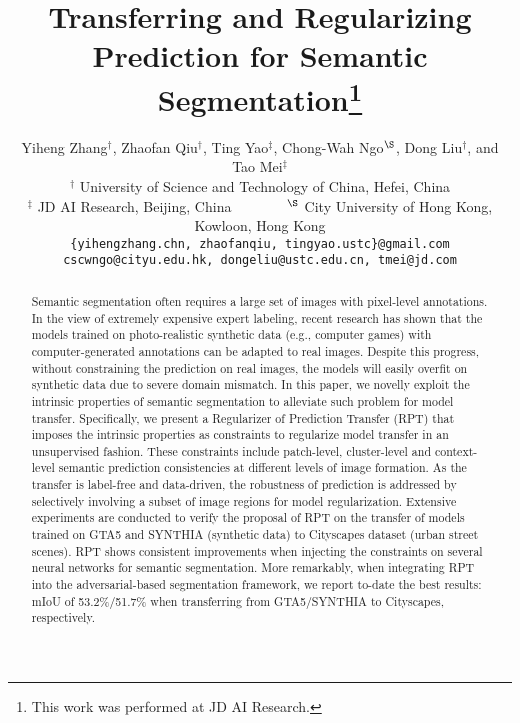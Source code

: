 \documentclass[10pt,twocolumn,letterpaper]{article}
\begin{document}
\title{Transferring and Regularizing Prediction for Semantic Segmentation\thanks{{\small This work was performed at JD AI Research.}}}

\author{Yiheng Zhang$^{\dag}$, Zhaofan Qiu$^{\dag}$, Ting Yao$^{\ddag}$, Chong-Wah Ngo$^{\S}$, Dong Liu$^{\dag}$, and Tao Mei$^{\ddag}$ \\
{\normalsize $^{\dag}$ University of Science and Technology of China, Hefei, China}\\
{\normalsize $^{\ddag}$ JD AI Research, Beijing, China~~~~~~~~$^{\S}$ City University of Hong Kong, Kowloon, Hong Kong}\\
{\tt\small \{yihengzhang.chn, zhaofanqiu, tingyao.ustc\}@gmail.com}\\
{\tt\small cscwngo@cityu.edu.hk, dongeliu@ustc.edu.cn, tmei@jd.com}
}

\maketitle
\thispagestyle{empty}

\begin{abstract}
   \vspace{-0.1in}
   Semantic segmentation often requires a large set of images with pixel-level annotations. In the view of extremely expensive expert labeling, recent research has shown that the models trained on photo-realistic synthetic data (e.g., computer games) with computer-generated annotations can be adapted to real images. Despite this progress, without constraining the prediction on real images, the models will easily overfit on synthetic data due to severe domain mismatch.
   In this paper, we novelly exploit the intrinsic properties of semantic segmentation to alleviate such problem for model transfer.
   Specifically, we present a Regularizer of Prediction Transfer (RPT) that imposes the intrinsic properties as constraints to regularize model transfer in an unsupervised fashion. These constraints include patch-level, cluster-level and context-level semantic prediction consistencies at different levels of image formation. As the transfer is label-free and data-driven, the robustness of prediction is addressed by selectively involving a subset of image regions for model regularization. Extensive experiments are conducted to verify the proposal of RPT on the transfer of models trained on GTA5 and SYNTHIA (synthetic data) to Cityscapes dataset (urban street scenes). RPT shows consistent improvements when injecting the constraints on several neural networks for semantic segmentation. More remarkably, when integrating RPT into the adversarial-based segmentation framework, we report to-date the best results: mIoU of 53.2\%/51.7\% when transferring from GTA5/SYNTHIA to Cityscapes, respectively.
\end{abstract}
\vspace{-0.15in}
\end{document}
